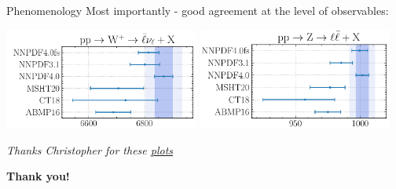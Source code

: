 \documentclass[aspectratio=169,11pt]{beamer}
\begin{document}
\begin{frame}[t]{Phenomenology}
  Most importantly - good agreement at the level of observables:
  \begin{center}
    \includegraphics[width=0.48\textwidth]{figures/pheno_w.png} \hfill
    \includegraphics[width=0.48\textwidth]{figures/pheno_z.png}
  \end{center}
  {\it Thanks Christopher for these {\color{blue} \underline{ \href{https://vp.nnpdf.science/de96i8VBQ9Gc-zxl75AMfw==/pheno_featurescaling.pdf}{plots}}}}
\end{frame}



\bgroup
  \begin{frame}{}
    \color{white}
    \huge
    \begin{center}
      \textbf{Thank you!}
    \end{center}
  \end{frame}
\egroup



\end{document}
